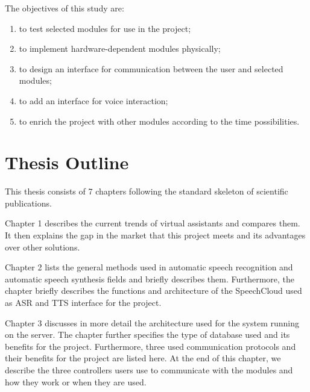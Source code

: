 




The objectives of this study are:

\begin{enumerate}
    \item to test selected modules for use in the project;
    \item to implement hardware-dependent modules physically;
    \item to design an interface for communication between the user and selected modules;
    \item to add an interface for voice interaction;
    \item to enrich the project with other modules according to the time possibilities.
\end{enumerate}

\section{Thesis Outline} \label{sec:thesis_outline}

This thesis consists of 7 chapters following the standard skeleton of scientific publications.

Chapter 1 describes the current trends of virtual assistants and compares them. It then explains the gap in the market that this project meets and its advantages over other solutions.

Chapter 2 lists the general methods used in automatic speech recognition and automatic speech synthesis fields and briefly describes them. Furthermore, the chapter briefly describes the functions and architecture of the SpeechCloud used as ASR and TTS interface for the project.

Chapter 3 discusses in more detail the architecture used for the system running on the server. The chapter further specifies the type of database used and its benefits for the project. Furthermore, three used communication protocols and their benefits for the project are listed here. At the end of this chapter, we describe the three controllers users use to communicate with the modules and how they work or when they are used.

